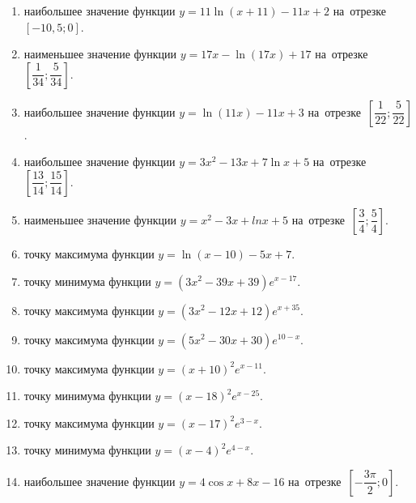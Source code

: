 \documentclass[a4paper,10pt]{article}
\begin{document}
\begin{enumerate}
\item {} наибольшее значение функции $y = 11\ln \left(x+11\right)-11x +2$ на~отрезке~$\left[-10,5;0\right]$.

\item {} наименьшее значение функции $y = 17x-\ln \left(17x\right)+17$ на~отрезке~$\left[\dfrac{1}{34};\dfrac{5}{34}\right]$.

\item {} наибольшее значение функции $y = \ln \left(11x\right)-11x+3$ на~отрезке~$\left[\dfrac{1}{22};\dfrac{5}{22}\right]$.

\item {} наибольшее значение функции $y=3x^2-13x+7\ln x+5$ на~отрезке~$\left[\dfrac{13}{14};\dfrac{15}{14}\right]$.

\item {} наименьшее значение функции $y=x^2-3x+ln x+5$ на~отрезке~$\left[\dfrac{3}{4};\dfrac{5}{4}\right]$.







\item {} точку максимума функции $y=\ln \left(x-10\right)-5x+7$.

\item {} точку минимума функции $y=\left(3x^2-39x+39\right)e^{x-17}$.

\item {} точку максимума функции $y=\left(3x^2-12x+12\right)e^{x+35}$.

\item {} точку максимума функции $y=\left(5x^2-30x+30\right)e^{10-x}$.

\item {} точку максимума функции $y=\left(x +10\right)^2e^{x-11}$.

\item {} точку минимума функции $y=\left(x -18\right)^2e^{x-25}$.

\item {} точку максимума функции $y=\left(x -17\right)^2e^{3-x}$.

\item {} точку минимума функции $y=\left(x -4\right)^2e^{4-x}$.

\item {} наибольшее значение функции $y=4\cos x+8x -16$ на~отрезке~$\left[-\dfrac{3\pi }{2};0\right]$.


\end{enumerate}
\end{document}

